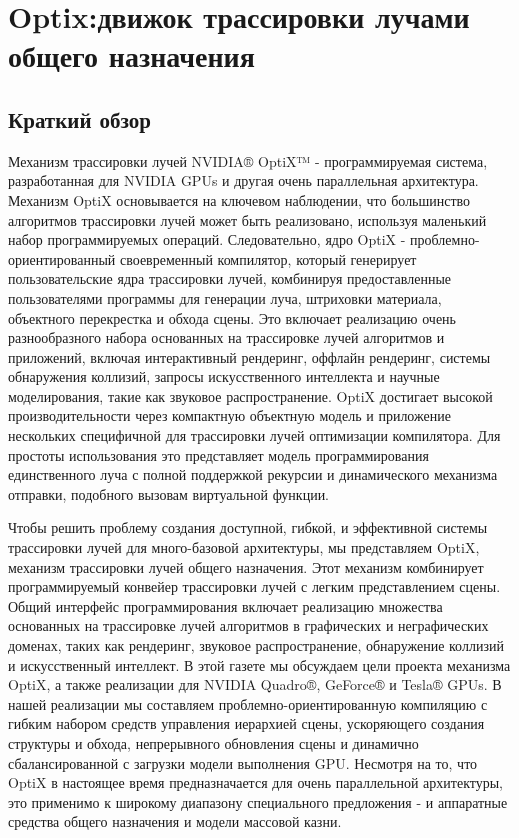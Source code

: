 \section{Optix:движок трассировки лучами общего назначения}
\subsection{Краткий обзор}
Механизм трассировки лучей NVIDIA® OptiX™ - программируемая система, разработанная для NVIDIA GPUs и другая очень параллельная архитектура.
Механизм OptiX основывается на ключевом наблюдении, что большинство алгоритмов трассировки лучей может быть реализовано, используя маленький набор программируемых операций. Следовательно, ядро OptiX - проблемно-ориентированный своевременный компилятор, который генерирует пользовательские ядра трассировки лучей, комбинируя предоставленные пользователями программы для генерации луча, штриховки материала, объектного перекрестка и обхода сцены. Это включает реализацию очень разнообразного набора основанных на трассировке лучей алгоритмов и приложений, включая интерактивный рендеринг, оффлайн рендеринг, системы обнаружения коллизий, запросы искусственного интеллекта и научные моделирования, такие как звуковое распространение. OptiX достигает высокой производительности через компактную объектную модель и приложение нескольких специфичной для трассировки лучей оптимизации компилятора. Для простоты использования это представляет модель программирования единственного луча с полной поддержкой рекурсии и динамического механизма отправки, подобного вызовам виртуальной функции.

Чтобы решить проблему создания доступной, гибкой, и эффективной системы трассировки лучей для много-базовой архитектуры, мы представляем OptiX, механизм трассировки лучей общего назначения. Этот механизм комбинирует программируемый конвейер трассировки лучей с легким представлением сцены. Общий интерфейс программирования включает реализацию множества основанных на трассировке лучей алгоритмов в графических и неграфических доменах, таких как рендеринг, звуковое распространение, обнаружение коллизий и искусственный интеллект.
В этой газете мы обсуждаем цели проекта механизма OptiX, а также реализации для NVIDIA Quadro®, GeForce® и Tesla® GPUs. В нашей реализации мы составляем проблемно-ориентированную компиляцию с гибким набором средств управления иерархией сцены, ускоряющего создания структуры и обхода, непрерывного обновления сцены и динамично сбалансированной с загрузки модели выполнения GPU. Несмотря на то, что OptiX в настоящее время предназначается для очень параллельной архитектуры, это применимо к широкому диапазону специального предложения - и аппаратные средства общего назначения и модели массовой казни.

